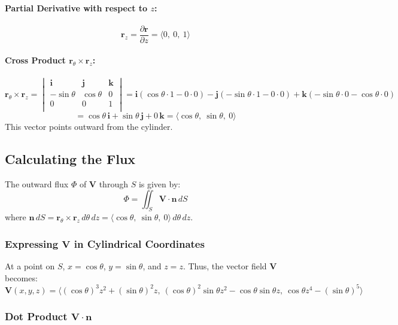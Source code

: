 \documentclass[11pt]{article}
\begin{document}
\paragraph{Partial Derivative with respect to \( z \):}
\[
\mathbf{r}_z = \frac{\partial \mathbf{r}}{\partial z} = \langle 0, \ 0, \ 1 \rangle
\]

\paragraph{Cross Product \( \mathbf{r}_\theta \times \mathbf{r}_z \):}
\[
\mathbf{r}_\theta \times \mathbf{r}_z =
\begin{vmatrix}
\mathbf{i} & \mathbf{j} & \mathbf{k} \\
-\sin\theta & \cos\theta & 0 \\
0 & 0 & 1 \\
\end{vmatrix}
= \mathbf{i} (\cos\theta \cdot 1 - 0 \cdot 0) - \mathbf{j} (-\sin\theta \cdot 1 - 0 \cdot 0) + \mathbf{k} (-\sin\theta \cdot 0 - \cos\theta \cdot 0)
\]
\[
= \cos\theta \, \mathbf{i} + \sin\theta \, \mathbf{j} + 0 \, \mathbf{k} = \langle \cos\theta, \ \sin\theta, \ 0 \rangle
\]
This vector points outward from the cylinder.

\newpage

\subsection{Calculating the Flux}

The outward flux \( \Phi \) of \( \mathbf{V} \) through \( S \) is given by:
\[
\Phi = \iint_{S} \mathbf{V} \cdot \mathbf{n} \, dS
\]
where \( \mathbf{n} \, dS = \mathbf{r}_\theta \times \mathbf{r}_z \, d\theta \, dz = \langle \cos\theta, \ \sin\theta, \ 0 \rangle \, d\theta \, dz \).

\subsubsection*{Expressing \( \mathbf{V} \) in Cylindrical Coordinates}

At a point on \( S \), \( x = \cos\theta \), \( y = \sin\theta \), and \( z = z \). Thus, the vector field \( \mathbf{V} \) becomes:
\[
\mathbf{V}(x, y, z) = \langle (\cos\theta)^3 z^2 + (\sin\theta)^2 z, \ (\cos\theta)^2 \sin\theta z^2 - \cos\theta \sin\theta z, \ \cos\theta z^4 - (\sin\theta)^5 \rangle
\]

\subsubsection*{Dot Product \( \mathbf{V} \cdot \mathbf{n} \)}
\end{document}
